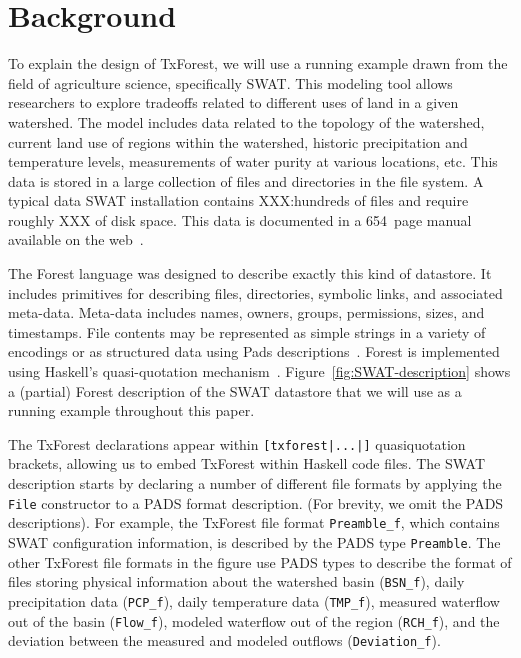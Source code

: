 \section{Background}
\label{sec:Background}


To explain the design of TxForest, we will use a running example drawn
from the field of agriculture science, specifically SWAT.  This
modeling tool allows researchers to explore tradeoffs related to
different uses of land in a given watershed.  The model includes data
related to the topology of the watershed, current land use of regions
within the watershed, historic precipitation and temperature levels,
measurements of water purity at various locations, etc.  This data is
stored in a large collection of files and directories in the file
system.  A typical data SWAT installation contains XXX:hundreds of
files and require roughly XXX of disk space.  This data is documented
in a 654~page manual available on the web~\cite{SWAT-IO-Documentation}.

The Forest language was designed to describe exactly this kind of
datastore.  It includes primitives for describing files,
directories, symbolic links, and associated meta-data.  Meta-data
includes names, owners, groups, permissions, sizes, and timestamps.
File contents may be represented as simple strings in a variety of
encodings or as structured data using Pads
descriptions~\cite{fisher+:pads,fisher-walker:icdt}. Forest is
implemented using Haskell's quasi-quotation
mechanism~\cite{Mainland:quasi}.  Figure~\ref{fig:SWAT-description}
shows a (partial) Forest description of the SWAT datastore
that we will use as a running example throughout this paper.

The TxForest declarations appear within \texttt{[txforest|...|]}
quasiquotation brackets, allowing us to embed TxForest within Haskell
code files.  The SWAT description starts by declaring a number of
different file formats by applying the \texttt{File} constructor to
a PADS format description.  (For brevity, we omit the PADS
descriptions).   For example, the TxForest file format
\texttt{Preamble\_f}, which contains SWAT configuration information,
is described by the PADS type \texttt{Preamble}.
The other TxForest file formats in the figure use PADS types to
describe the format of files storing 
physical information about the watershed basin (\texttt{BSN\_f}),
daily precipitation data (\texttt{PCP\_f}),
daily temperature data (\texttt{TMP\_f}),
measured waterflow out of the basin (\texttt{Flow\_f}),
modeled waterflow out of the region (\texttt{RCH\_f}),
and the deviation between the measured and modeled outflows (\texttt{Deviation\_f}).

